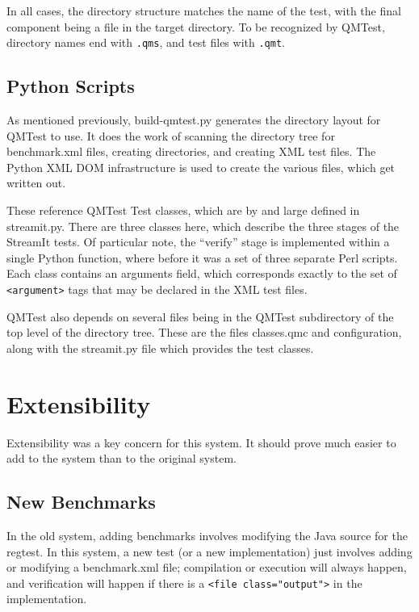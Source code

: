 \documentclass[11pt]{article}
\begin{document}
In all cases, the directory structure matches the name of the test,
with the final component being a file in the target directory.  To be
recognized by QMTest, directory names end with \texttt{.qms}, and test
files with \texttt{.qmt}.

\subsection{Python Scripts}

As mentioned previously, \textsf{build-qmtest.py} generates the
directory layout for QMTest to use.  It does the work of scanning the
directory tree for \textsf{benchmark.xml} files, creating directories,
and creating XML test files.  The Python XML DOM infrastructure is
used to create the various files, which get written out.

These reference QMTest Test classes, which are by and large defined in
\textsf{streamit.py}.  There are three classes here, which describe the
three stages of the StreamIt tests.  Of particular note, the
``verify'' stage is implemented within a single Python function, where
before it was a set of three separate Perl scripts.  Each class
contains an \textsf{arguments} field, which corresponds exactly to the
set of \verb|<argument>| tags that may be declared in the XML test
files.

QMTest also depends on several files being in the \textsf{QMTest}
subdirectory of the top level of the directory tree.  These are the
files \textsf{classes.qmc} and \textsf{configuration}, along with the
\textsf{streamit.py} file which provides the test classes.

\section{Extensibility}

Extensibility was a key concern for this system.  It should prove much
easier to add to the system than to the original system.

\subsection{New Benchmarks}

In the old system, adding benchmarks involves modifying the Java
source for the regtest.  In this system, a new test (or a new
implementation) just involves adding or modifying a
\textsf{benchmark.xml} file; compilation or execution will always
happen, and verification will happen if there is a
\verb|<file class="output">| in the implementation.
\end{document}
